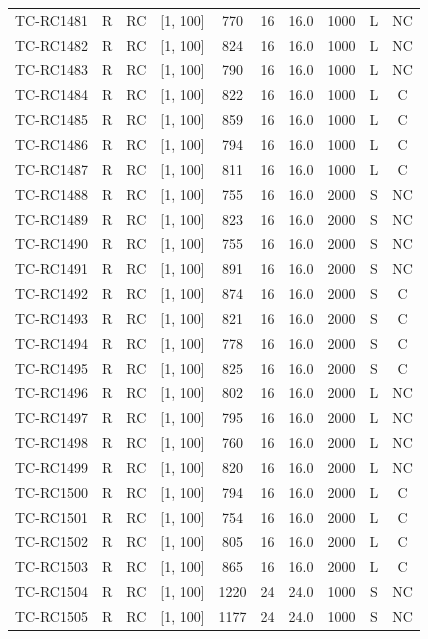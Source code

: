 \begin{longtable}{lccccccccc}
TC-RC1481 & R & RC & [1, 100] & 770 & 16 & 16.0 & 1000 & L & NC \\
TC-RC1482 & R & RC & [1, 100] & 824 & 16 & 16.0 & 1000 & L & NC \\
TC-RC1483 & R & RC & [1, 100] & 790 & 16 & 16.0 & 1000 & L & NC \\
TC-RC1484 & R & RC & [1, 100] & 822 & 16 & 16.0 & 1000 & L & C \\
TC-RC1485 & R & RC & [1, 100] & 859 & 16 & 16.0 & 1000 & L & C \\
TC-RC1486 & R & RC & [1, 100] & 794 & 16 & 16.0 & 1000 & L & C \\
TC-RC1487 & R & RC & [1, 100] & 811 & 16 & 16.0 & 1000 & L & C \\
TC-RC1488 & R & RC & [1, 100] & 755 & 16 & 16.0 & 2000 & S & NC \\
TC-RC1489 & R & RC & [1, 100] & 823 & 16 & 16.0 & 2000 & S & NC \\
TC-RC1490 & R & RC & [1, 100] & 755 & 16 & 16.0 & 2000 & S & NC \\
TC-RC1491 & R & RC & [1, 100] & 891 & 16 & 16.0 & 2000 & S & NC \\
TC-RC1492 & R & RC & [1, 100] & 874 & 16 & 16.0 & 2000 & S & C \\
TC-RC1493 & R & RC & [1, 100] & 821 & 16 & 16.0 & 2000 & S & C \\
TC-RC1494 & R & RC & [1, 100] & 778 & 16 & 16.0 & 2000 & S & C \\
TC-RC1495 & R & RC & [1, 100] & 825 & 16 & 16.0 & 2000 & S & C \\
TC-RC1496 & R & RC & [1, 100] & 802 & 16 & 16.0 & 2000 & L & NC \\
TC-RC1497 & R & RC & [1, 100] & 795 & 16 & 16.0 & 2000 & L & NC \\
TC-RC1498 & R & RC & [1, 100] & 760 & 16 & 16.0 & 2000 & L & NC \\
TC-RC1499 & R & RC & [1, 100] & 820 & 16 & 16.0 & 2000 & L & NC \\
TC-RC1500 & R & RC & [1, 100] & 794 & 16 & 16.0 & 2000 & L & C \\
TC-RC1501 & R & RC & [1, 100] & 754 & 16 & 16.0 & 2000 & L & C \\
TC-RC1502 & R & RC & [1, 100] & 805 & 16 & 16.0 & 2000 & L & C \\
TC-RC1503 & R & RC & [1, 100] & 865 & 16 & 16.0 & 2000 & L & C \\
TC-RC1504 & R & RC & [1, 100] & 1220 & 24 & 24.0 & 1000 & S & NC \\
TC-RC1505 & R & RC & [1, 100] & 1177 & 24 & 24.0 & 1000 & S & NC \\

\end{longtable}
